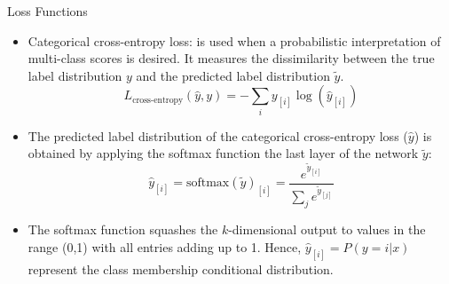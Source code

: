 \documentclass[handout]{beamer}
\begin{document}
\begin{frame}{Loss Functions}
\begin{scriptsize}
\begin{itemize}

 \item Categorical cross-entropy loss:  is used when a probabilistic interpretation of multi-class scores is desired. It measures the dissimilarity between the true label distribution $y$ and the predicted label distribution $\tilde{y}$. 
   \begin{displaymath}
  L_{\text{cross-entropy}}(\hat{y},y) = - \sum_{i} y_{[i]} \log(\hat{y}_{[i]})   
 \end{displaymath}
\item The predicted label distribution of the categorical cross-entropy loss ($\hat{y}$) is obtained by applying the softmax function the last layer of the network $\tilde{y}$:
    \begin{displaymath}
\hat{y}_{[i]} = \text{softmax}(\tilde{y})_{[i]} =  \frac{e^{\tilde{y}_{[i]}}}{\sum_{j}e^{\tilde{y}_{[j]}}}   
 \end{displaymath}
 
\item The softmax function squashes the $k$-dimensional output to values in the range (0,1) with all entries adding up to 1. Hence, $\hat{y}_{[i]} = P( y = i |x)$ represent the class membership conditional distribution.
 
\end{itemize}
\end{scriptsize}


\end{frame}
\end{document}
